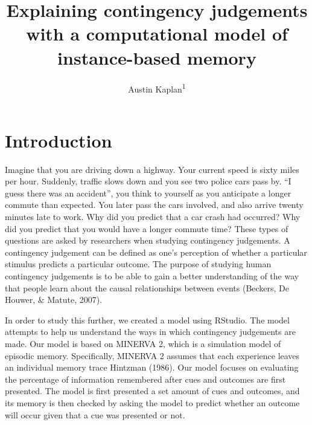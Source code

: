 \documentclass[
  english,
  man,floatsintext]{apa6}
\title{Explaining contingency judgements with a computational model of instance-based memory}
\author{Austin Kaplan\textsuperscript{1}}
\date{}
\affiliation{\vspace{0.5cm}\textsuperscript{1} Brooklyn College}
\begin{document}
\maketitle

\hypertarget{introduction}{%
\section{Introduction}\label{introduction}}

Imagine that you are driving down a highway. Your current speed is sixty miles per hour. Suddenly, traffic slows down and you see two police cars pass by. \enquote{I guess there was an accident}, you think to yourself as you anticipate a longer commute than expected. You later pass the cars involved, and also arrive twenty minutes late to work. Why did you predict that a car crash had occurred? Why did you predict that you would have a longer commute time? These types of questions are asked by researchers when studying contingency judgements. A contingency judgement can be defined as one's perception of whether a particular stimulus predicts a particular outcome. The purpose of studying human contingency judgements is to be able to gain a better understanding of the way that people learn about the causal relationships between events (Beckers, De Houwer, \& Matute, 2007).

In order to study this further, we created a model using RStudio. The model attempts to help us understand the ways in which contingency judgements are made. Our model is based on MINERVA 2, which is a simulation model of episodic memory. Specifically, MINERVA 2 assumes that each experience leaves an individual memory trace Hintzman (1986). Our model focuses on evaluating the percentage of information remembered after cues and outcomes are first presented. The model is first presented a set amount of cues and outcomes, and its memory is then checked by asking the model to predict whether an outcome will occur given that a cue was presented or not.
\end{document}
